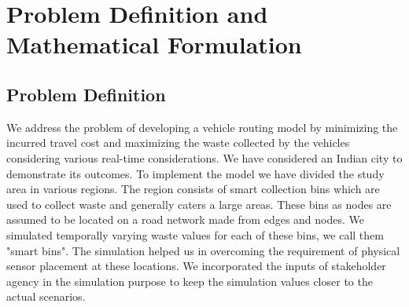 \documentclass[12pt]{article}
\begin{document}
\section{Problem Definition and Mathematical Formulation}


\subsection{Problem Definition}
We address the problem of developing a vehicle routing model by minimizing the incurred travel cost and maximizing the waste collected by the vehicles considering various real-time considerations. We have considered an Indian city to demonstrate its outcomes. To implement the model we have divided the study area in various regions. The region consists of smart collection bins which are used to collect waste and generally caters a large areas. These bins as nodes are assumed to be located on a road network made from edges and nodes. We simulated temporally varying waste values for each of these bins, we call them "smart bins". The simulation helped us in overcoming the requirement of physical sensor placement at these locations. We incorporated the inputs of stakeholder agency in the simulation purpose to keep the simulation values closer to the actual scenarios.
	
\end{document}
